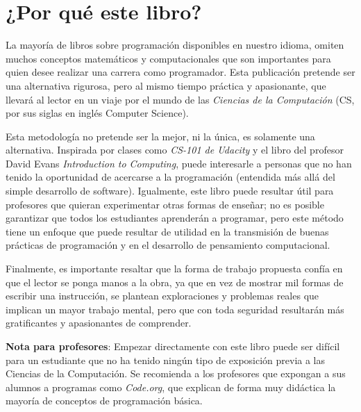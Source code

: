 \thispagestyle{empty}

\chapter{¿Por qué este libro?}
    La mayoría de libros sobre programación disponibles en nuestro idioma, omiten muchos conceptos matemáticos y computacionales que son importantes para quien desee realizar una carrera como programador. Esta publicación pretende ser una alternativa rigurosa, pero al mismo tiempo práctica y apasionante, que llevará al lector en un viaje por el mundo de las \emph{Ciencias de la Computación} (CS, por sus siglas en inglés Computer Science).    
    
    Esta metodología no pretende ser la mejor, ni la única, es solamente una alternativa. Inspirada por clases como \emph{CS-101 de Udacity} y el libro del profesor David Evans \emph{Introduction to Computing}, puede interesarle a personas que no han tenido la oportunidad de acercarse a la programación (entendida más allá del simple desarrollo de software). Igualmente, este libro puede resultar útil para profesores que quieran experimentar otras formas de enseñar; no es posible  garantizar que todos los estudiantes aprenderán a programar, pero este método tiene un enfoque que puede resultar de utilidad en la transmisión de buenas prácticas de programación y en el desarrollo de pensamiento computacional.
    
    Finalmente, es importante resaltar que la forma de trabajo propuesta confía en que el lector se ponga manos a la obra, ya que en vez de mostrar mil formas de escribir una instrucción,  se plantean exploraciones y problemas reales que implican un mayor trabajo mental, pero que con toda seguridad resultarán más gratificantes y apasionantes de comprender.
     
    \newpage
    \thispagestyle{empty}
        \textbf{Nota para profesores}: Empezar directamente con este libro puede ser difícil para un estudiante que no ha tenido ningún tipo de exposición previa a las Ciencias de la Computación. Se recomienda a los profesores que expongan a sus alumnos a programas como \emph{Code.org}, que explican de forma muy didáctica la mayoría de conceptos de programación básica.
      
    
  
    
 